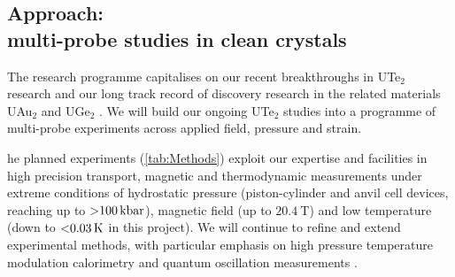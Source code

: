










\subsection*{Approach: \\ multi-probe studies in clean crystals}
\noindent
The research programme capitalises on our recent breakthroughs in UTe$_2$ research and our long track record of discovery research in the related materials UAu$_2$ \cite{oneill22} and UGe$_2$ \cite{saxena00}. We will build our ongoing UTe$_2$ studies into a programme of multi-probe experiments across applied field, pressure and strain.

he planned experiments (\autoref{tab:Methods}) exploit our expertise and facilities in high precision transport, magnetic and thermodynamic measurements under extreme conditions of hydrostatic pressure (piston-cylinder and anvil cell devices, reaching up to $\SI{>100}{\kilo\bar}$), magnetic field (up to $\SI{20.4}{\tesla}$) and low temperature (down to $\SI{<0.03}{\kelvin}$ in this project). We will continue to refine and extend experimental methods, with particular emphasis on high pressure temperature modulation calorimetry and quantum oscillation measurements  . %

